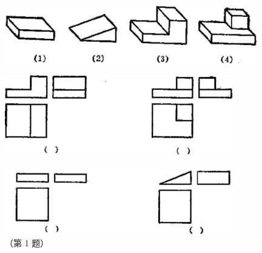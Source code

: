 \begin{lianxi}


\begin{figure}[H]
    \centering
    \includegraphics[width=11cm]{../pic/czjh2-ch8-subsec3-lx-01-1.png}
\end{figure}

\begin{figure}[H]
    \centering
    \includegraphics[width=10cm]{../pic/czjh2-ch8-subsec3-lx-01-2.png}
\end{figure}

\begin{figure}[H]
    \centering
    \includegraphics[width=10cm]{../pic/czjh2-ch8-subsec3-lx-01-3.png}
    \caption*{（第 1 题）}
\end{figure}



\end{lianxi}
